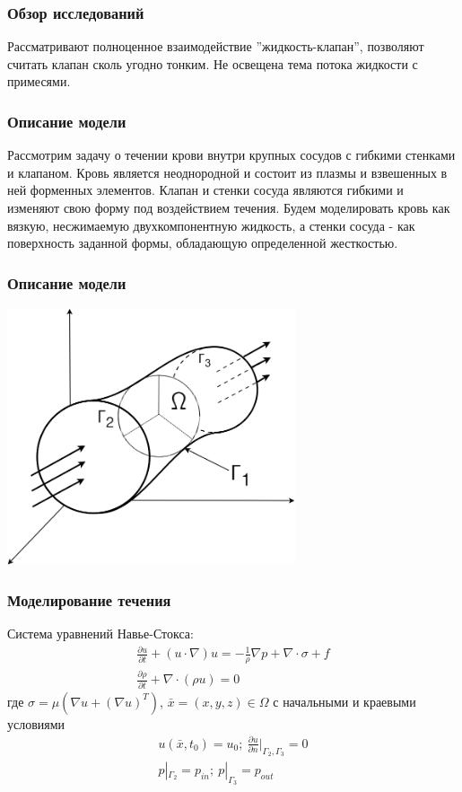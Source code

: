 \documentclass[14pt]{beamer}
\begin{document}
\begin{frame}
\frametitle{Обзор исследований}
    Рассматривают полноценное взаимодействие ''жидкость-клапан'', позволяют считать клапан сколь угодно тонким.
    Не освещена тема потока жидкости с примесями.
\end{frame}

\begin{frame}
\frametitle{Описание модели}
Рассмотрим задачу о течении крови внутри крупных сосудов с гибкими стенками и клапаном. Кровь является неоднородной и состоит из плазмы и взвешенных в ней форменных элементов. Клапан и стенки сосуда являются гибкими и изменяют свою форму под воздействием течения. Будем моделировать кровь как вязкую, несжимаемую двухкомпонентную жидкость, а стенки сосуда - как поверхность заданной формы, обладающую определенной жесткостью.
\end{frame}

\begin{frame}
\frametitle{Описание модели}
    \begin{center}
        \includegraphics[width=8.5cm]{area_3d.png}
    \end{center}
\end{frame}

\begin{frame}
\frametitle{Моделирование течения}
Система уравнений Навье-Стокса:
\begin{gather}
    \label{eq:motion}
    \frac{\partial u}{\partial t} + (u \cdot \nabla) u = - \frac{1}{\rho} \nabla p + \nabla \cdot \sigma + f\\
    \label{eq:continuity}
    \frac{\partial \rho}{\partial t} + \nabla \cdot (\rho u) = 0 
\end{gather}
где $\sigma = \mu (\nabla u + (\nabla u)^{T})$, $\bar{x} = (x, y, z) \in \Omega$ с начальными и краевыми условиями
\begin{gather*}
    u(\bar{x}, t_0) = u_0;\ \frac{\partial u}{\partial n}|_{\Gamma_2, \Gamma_3} = 0\\
    p|_{\Gamma_2} = p_{in};\ p|_{\Gamma_3} = p_{out} \\
\end{gather*}

\end{frame}
\end{document}
